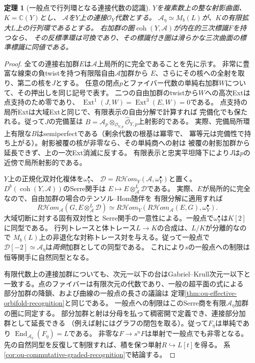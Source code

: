 \documentclass[11pt,a4paper]{ltjsarticle}
\newtheorem{theorem}{定理}[section]
\theoremstyle{definition}
\newcommand{\coh}{\operatorname{coh}}
\begin{document}
\begin{theorem}[一般点で行列環となる連接代数の認識]
\label{thm:ou-split-order-recognition}
$Y$を複素数上の整な射影曲面、$K=\mathbb C(Y)$とし、
$\mathscr A$を$Y$上の連接$\mathcal O_Y$代数とする。
$\mathscr A_\eta\simeq M_b(L)$が、$K$の有限拡大$L$上の行列環であるとする。
右加群の圏$\coh(Y,\mathscr A)$が内在的三次標識$F$を持つなら、
その反標準環は可換であり、その標識付き圏は滑らかな三次曲面の標準標識に同値である。
\end{theorem}
\begin{proof}
全ての連接右加群$E$は$\mathscr A$上局所的に完全であることを先に示す。
非常に豊富な線束の負twistを持つ有限階自由$\mathscr A$加群から
$E$、さらにその核への全射を取り、第二の核を$J$とする。
任意の閉点$p$とファイバー代数の単純右加群$W$について、その押出しを同じ記号で表す。
二つの自由加群のtwistから$W$への高次Extは点支持のため零であり、
$\operatorname{Ext}^1(J,W)=\operatorname{Ext}^3(E,W)=0$である。
点支持の局所Extは大域Extと同じで、有限表示の自由分解で計算すれば
完備化でも保たれる。従って$J$の完備茎は
$B=\mathscr A_p\otimes_{\mathcal O_{Y,p}}\widehat{\mathcal O}_{Y,p}$上射影的である。
実際、完備局所環上有限な$B$はsemiperfectである（剰余代数の根基は冪零で、
冪等元は完備性で持ち上がる）。射影被覆の核が非零なら、その単純商への射は
被覆の射影加群から延長できず、上の一次Ext消滅に反する。
有限表示と忠実平坦降下により$J$は$p$の近傍で局所射影的である。

$Y$上の正規化双対化複体を$\omega_Y^\bullet$、
$\mathscr D=R\mathcal H om_Y(\mathscr A,\omega_Y^\bullet)$と置く。
$D^b(\coh(Y,\mathscr A))$のSerre関手は
$E\mapsto E\otimes_{\mathscr A}^{L}\mathscr D$である。
実際、$E$が局所的に完全なので、自由加群の場合のテンソル--Hom随伴を
有限分解に適用すれば
\[
 R\mathcal H om_{\mathscr A}(G,E\otimes^L_{\mathscr A}\mathscr D)
 \simeq R\mathcal H om_Y(R\mathcal H om_{\mathscr A}(E,G),\omega_Y^\bullet).
\]
大域切断に対する固有双対性\cite[Tag 0FVU]{StacksProject}と
Serre関手の一意性による。一般点で$\omega_Y^\bullet$は$K[2]$に同型である。
行列トレースと体トレース$L\to K$の合成は、$L/K$が分離的なので
$M_b(L)$上の非退化な対称トレース対を与える。従って一般点で
$\mathscr D[-2]\simeq\mathscr A_\eta$は\emph{両側}加群としての同型である。
これにより$s$の一般点への制限は恒等関手に自然同型となる。

有限代数上の連接加群についても、次元一以下の台はGabriel--Krull次元一以下と
一致する。点のファイバーは有限次元の代数であり、一般の超平面の式による
部分加群の降鎖、および曲線の一般点の長さの議論は
定理\ref{thm:ou-effective-orbifold-recognition}と同じである。
一般点への制限はこのSerre商を有限$\mathscr A_\eta$加群の圏に同定する。
部分加群と射は分母を払って稠密開で定義でき、連接部分加群として延長できる
（例えば射にはグラフの閉包を取る）。従って$F_\eta$は単純であり
$\operatorname{End}_{\mathscr A_\eta}(F_\eta)=L$である。
非零な$F\to s^nF$は単射で一般点でも非零となる。
先の自然同型を反復して制限すれば、積を保つ単射$R\hookrightarrow L[t]$を得る。
系\ref{cor:ou-commutative-graded-recognition}で結論する。
\end{proof}
\end{document}
